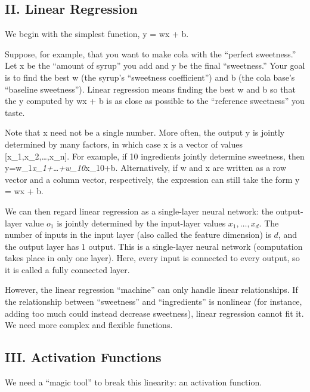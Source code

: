 \hypertarget{ii.-linear-regression}{%
\subsection{II. Linear Regression}\label{ii.-linear-regression}}

We begin with the simplest function, y = wx + b.

Suppose, for example, that you want to make cola with the ``perfect sweetness.'' Let x be the ``amount of syrup'' you add and y be the final ``sweetness.'' Your goal is to find the best w (the syrup's ``sweetness coefficient'') and b (the cola base's ``baseline sweetness''). Linear regression means finding the best w and b so that the y computed by wx + b is as close as possible to the ``reference sweetness'' you taste.

Note that x need not be a single number. More often, the output y is jointly determined by many factors, in which case x is a vector of values {[}x\_1,x\_2,\ldots,x\_n{]}. For example, if 10 ingredients jointly determine sweetness, then y=w\_1\emph{x\_1+\ldots+w\_10}x\_10+b. Alternatively, if w and x are written as a row vector and a column vector, respectively, the expression can still take the form y = wx + b.

We can then regard linear regression as a single-layer neural network: the output-layer value \(o_1\) is jointly determined by the input-layer values \(x_1,\ldots,x_d\). The number of inputs in the input layer (also called the feature dimension) is \(d\), and the output layer has \(1\) output. This is a single-layer neural network (computation takes place in only one layer). Here, every input is connected to every output, so it is called a fully connected layer.

However, the linear regression ``machine'' can only handle linear relationships. If the relationship between ``sweetness'' and ``ingredients'' is nonlinear (for instance, adding too much could instead decrease sweetness), linear regression cannot fit it. We need more complex and flexible functions.

\hypertarget{iii.-activation-functions}{%
\subsection{III. Activation Functions}\label{iii.-activation-functions}}

We need a ``magic tool'' to break this linearity: an activation function.

